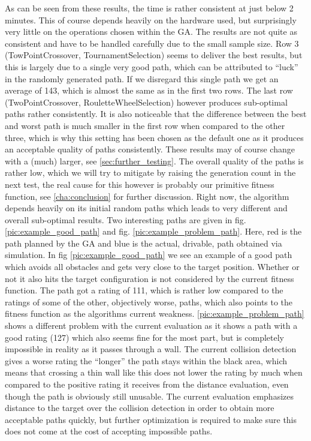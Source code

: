 As can be seen from these results, the time is rather consistent at just below 2 minutes. This of course depends heavily on the hardware used, but surprisingly very little on the operations chosen within the GA. The results are not quite as consistent and have to be handled carefully due to the small sample size. Row 3 (TowPointCrossover, TournamentSelection) seems to deliver the best results, but this is largely due to a single very good path, which can be attributed to "`luck"' in the randomly generated path. If we disregard this single path we get an average of 143, which is almost the same as in the first two rows. The last row (TwoPointCrossover, RouletteWheelSelection) however produces sub-optimal paths rather consistently. It is also noticeable that the difference between the best and worst path is much smaller in the first row when compared to the other three, which is why this setting has been chosen as the default one as it produces an acceptable quality of paths consistently. These results may of course change with a (much) larger, see \ref{sec:further_testing}.
The overall quality of the paths is rather low, which we will try to mitigate by raising the generation count in the next test, the real cause for this however is probably our primitive fitness function, see \ref{cha:conclusion} for further discussion. Right now, the algorithm depends heavily on its initial random paths which leads to very different and overall sub-optimal results.
Two interesting paths are given in fig. \ref{pic:example_good_path} and fig. \ref{pic:example_problem_path}. Here, red is the path planned by the GA and blue is the actual, drivable, path obtained via simulation. In fig \ref{pic:example_good_path} we see an example of a good path which avoids all obstacles and gets very close to the target position. Whether or not it also hits the target configuration is not considered by the current fitness function. The path got a rating of 111, which is rather low compared to the ratings of some of the other, objectively worse, paths, which also points to the fitness function as the algorithms current weakness. \ref{pic:example_problem_path} shows a different problem with the current evaluation as it shows a path with a good rating (127) which also seems fine for the most part, but is completely impossible in reality as it passes through a wall. The current collision detection gives a worse rating the "`longer"' the path stays within the black area, which means that crossing a thin wall like this does not lower the rating by much when compared to the positive rating it receives from the distance evaluation, even though the path is obviously still unusable. The current evaluation emphasizes distance to the target over the collision detection in order to obtain more acceptable paths quickly, but further optimization is required to make sure this does not come at the cost of accepting impossible paths.

